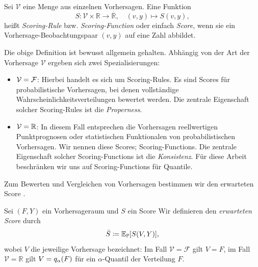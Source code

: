\begin{defi}
Sei $\mathcal V$ eine Menge aus einzelnen Vorhersagen. Eine Funktion
\[
S:\mathcal V\times\mathbb R\to\overline{\mathbb R},\quad (v,y)\mapsto S(v,y),
\]
heißt \emph{Scoring-Rule} bzw. \emph{Scoring-Function} oder einfach \emph{Score}, wenn sie ein Vorhersage-Beobachtungspaar $(v,y)$ auf eine Zahl abbildet.

Die obige Definition ist bewusst allgemein gehalten. Abhängig von der Art der Vorhersage $\mathcal V$ ergeben sich zwei Spezialisierungen:
\begin{itemize}
    \item $\mathcal{V}=\mathcal{F}$: Hierbei handelt es sich um Scoring-Rules. Es sind Scores für probabilistische Vorhersagen, bei denen vollständige Wahrscheinlichkeitsverteilungen bewertet werden. Die zentrale Eigenschaft solcher Scoring-Rules ist die \emph{Properness}.
    \item $\mathcal V=\mathbb{R}$: In diesem Fall entsprechen die Vorhersagen reellwertigen Punktprognosen oder statistischen Funktionalen von probabilistischen Vorhersagen. Wir nennen diese Scores; Scoring-Functions. Die zentrale Eigenschaft solcher Scoring-Functions ist die \emph{Konsistenz}. Für diese Arbeit beschränken wir uns auf Scoring-Functions für Quantile.\\
\end{itemize}
\end{defi}


\noindent
Zum Bewerten und Vergleichen von Vorhersagen bestimmen wir den erwarteten Score \parencite{gneiting2014probabilistic}.
\begin{defi}\label{def:exp_score}
Sei $(F,Y)$ ein Vorhersageraum und $S$ ein Score
Wir definieren den \emph{erwarteten Score} durch
\[
\bar S \coloneqq \mathbb{E}_{\mathbb{P}}[S(V,Y)],
\]
wobei $V$ die jeweilige Vorhersage bezeichnet: Im Fall $\mathcal{V} = \mathcal{F}$  gilt $V = F$, im Fall $\mathcal{V} = \mathbb{R}$ gilt $V = q_\alpha(F)$ für ein  $\alpha$-Quantil der Verteilung $F$.
\end{defi}{}

